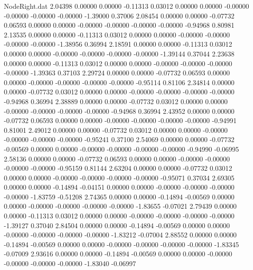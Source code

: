 \begin{filecontents}{NodeRight.dat}
   2.04398    0.00000    0.00000    -0.11313    0.03012    0.00000    0.00000   -0.00000   -0.00000   -0.00000   -0.00000   -1.39000    0.37006
   2.08454    0.00000    0.00000    -0.07732    0.06593    0.00000    0.00000   -0.00000   -0.00000   -0.00000   -0.00000   -0.94968    0.80981
   2.13535    0.00000    0.00000    -0.11313    0.03012    0.00000    0.00000   -0.00000   -0.00000   -0.00000   -0.00000   -1.38956    0.36994
   2.18591    0.00000    0.00000    -0.11313    0.03012    0.00000    0.00000   -0.00000   -0.00000   -0.00000   -0.00000   -1.39144    0.37044
   2.23638    0.00000    0.00000    -0.11313    0.03012    0.00000    0.00000   -0.00000   -0.00000   -0.00000   -0.00000   -1.39363    0.37103
   2.29724    0.00000    0.00000    -0.07732    0.06593    0.00000    0.00000   -0.00000   -0.00000   -0.00000   -0.00000   -0.95114    0.81106
   2.34814    0.00000    0.00000    -0.07732    0.03012    0.00000    0.00000   -0.00000   -0.00000   -0.00000   -0.00000   -0.94968    0.36994
   2.38889    0.00000    0.00000    -0.07732    0.03012    0.00000    0.00000   -0.00000   -0.00000   -0.00000   -0.00000   -0.94968    0.36994
   2.43952    0.00000    0.00000    -0.07732    0.06593    0.00000    0.00000   -0.00000   -0.00000   -0.00000   -0.00000   -0.94991    0.81001
   2.49012    0.00000    0.00000    -0.07732    0.03012    0.00000    0.00000   -0.00000   -0.00000   -0.00000   -0.00000   -0.95241    0.37100
   2.54069    0.00000    0.00000    -0.07732   -0.00569    0.00000    0.00000   -0.00000   -0.00000   -0.00000   -0.00000   -0.94990   -0.06995
   2.58136    0.00000    0.00000    -0.07732    0.06593    0.00000    0.00000   -0.00000   -0.00000   -0.00000   -0.00000   -0.95159    0.81144
   2.63204    0.00000    0.00000    -0.07732    0.03012    0.00000    0.00000   -0.00000   -0.00000   -0.00000   -0.00000   -0.95071    0.37034
   2.69305    0.00000    0.00000    -0.14894   -0.04151    0.00000    0.00000   -0.00000   -0.00000   -0.00000   -0.00000   -1.83759   -0.51208
   2.74365    0.00000    0.00000    -0.14894   -0.00569    0.00000    0.00000   -0.00000   -0.00000   -0.00000   -0.00000   -1.83655   -0.07021
   2.79439    0.00000    0.00000    -0.11313    0.03012    0.00000    0.00000   -0.00000   -0.00000   -0.00000   -0.00000   -1.39127    0.37040
   2.84504    0.00000    0.00000    -0.14894   -0.00569    0.00000    0.00000   -0.00000   -0.00000   -0.00000   -0.00000   -1.83212   -0.07004
   2.88552    0.00000    0.00000    -0.14894   -0.00569    0.00000    0.00000   -0.00000   -0.00000   -0.00000   -0.00000   -1.83345   -0.07009
   2.93616    0.00000    0.00000    -0.14894   -0.00569    0.00000    0.00000   -0.00000   -0.00000   -0.00000   -0.00000   -1.83040   -0.06997

\end{filecontents}

